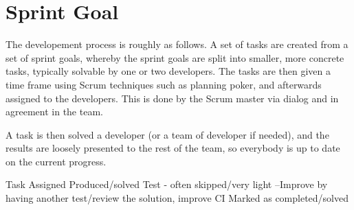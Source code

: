 \section{Sprint Goal}


The developement process is roughly as follows. A set of tasks are created from a set of sprint goals, whereby the sprint goals are split into smaller, more concrete tasks, typically solvable by one or two developers. The tasks are then given a time frame using Scrum techniques such as planning poker, and afterwards assigned to the developers. This is done by the Scrum master via dialog and in agreement in the team. 

A task is then solved a developer (or a team of developer if needed), and the results are loosely presented to the rest of the team, so everybody is up to date on the current progress. 


Task
Assigned
Produced/solved
Test - often skipped/very light
--Improve by having another test/review the solution, improve CI
Marked as completed/solved